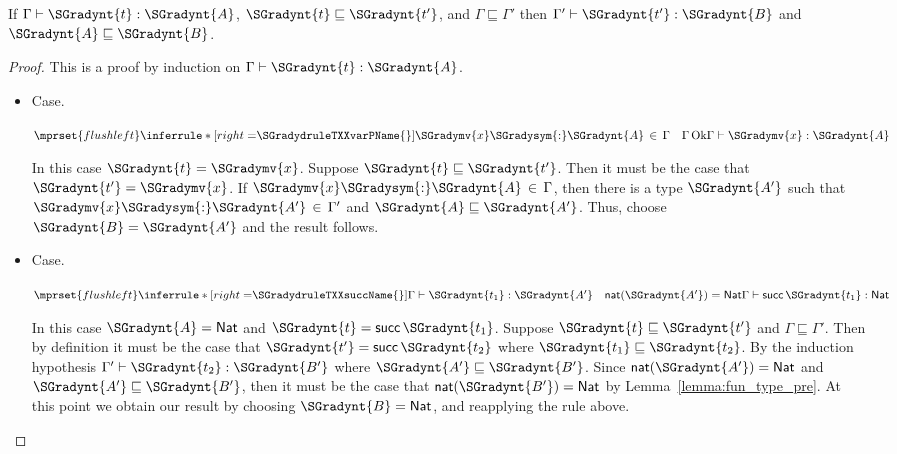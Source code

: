 \begin{lemma}
  \label{lemma:gradual_guarantee_part_one}
  If $ \Gamma  \vdash  \SGradynt{t}  :  \SGradynt{A} $, $ \SGradynt{t}  \sqsubseteq  \SGradynt{t'} $, and $ \Gamma  \sqsubseteq  \Gamma' $ then $ \Gamma'  \vdash  \SGradynt{t'}  :  \SGradynt{B} $ and $ \SGradynt{A}  \sqsubseteq  \SGradynt{B} $.
\end{lemma}
\begin{proof}
  This is a proof by induction on $ \Gamma  \vdash  \SGradynt{t}  :  \SGradynt{A} $.

  \begin{itemize}
  \item[] Case.\ \\ 
    \begin{center}
      \begin{math}
        $$\mprset{flushleft}
        \inferrule* [right=$\SGradydruleTXXvarPName{}$] {
           \SGradymv{x}  \SGradysym{:}  \SGradynt{A} \, \in \, \Gamma  \quad   \Gamma \,\text{Ok}  
        }{ \Gamma  \vdash  \SGradymv{x}  :  \SGradynt{A} }
      \end{math}
    \end{center}
    In this case $\SGradynt{t} = \SGradymv{x}$.  Suppose $ \SGradynt{t}  \sqsubseteq  \SGradynt{t'} $.  Then
    it must be the case that $\SGradynt{t'} = \SGradymv{x}$.  If $\SGradymv{x}  \SGradysym{:}  \SGradynt{A} \, \in \, \Gamma$,
    then there is a type $\SGradynt{A'}$ such that $\SGradymv{x}  \SGradysym{:}  \SGradynt{A'} \, \in \, \Gamma'$ and
    $ \SGradynt{A}  \sqsubseteq  \SGradynt{A'} $.  Thus, choose $\SGradynt{B} = \SGradynt{A'}$ and the result follows.

  \item[] Case.\ \\ 
    \begin{center}
      \begin{math}
        $$\mprset{flushleft}
        \inferrule* [right=$\SGradydruleTXXsuccName{}$] {
            \Gamma  \vdash  \SGradynt{t_{{\mathrm{1}}}}  :  \SGradynt{A'}   \quad   \mathsf{nat}( \SGradynt{A'} ) =   \mathsf{Nat}   
        }{ \Gamma  \vdash  \mathsf{succ} \, \SGradynt{t_{{\mathrm{1}}}}  :   \mathsf{Nat}  }
      \end{math}
    \end{center}
    In this case $\SGradynt{A} =  \mathsf{Nat} $ and $\SGradynt{t} = \mathsf{succ} \, \SGradynt{t_{{\mathrm{1}}}}$.  Suppose $ \SGradynt{t}  \sqsubseteq  \SGradynt{t'} $ and $ \Gamma  \sqsubseteq  \Gamma' $.
    Then by definition it must be the case that $\SGradynt{t'} = \mathsf{succ} \, \SGradynt{t_{{\mathrm{2}}}}$ where $ \SGradynt{t_{{\mathrm{1}}}}  \sqsubseteq  \SGradynt{t_{{\mathrm{2}}}} $.
    By the induction hypothesis $ \Gamma'  \vdash  \SGradynt{t_{{\mathrm{2}}}}  :  \SGradynt{B'} $ where $ \SGradynt{A'}  \sqsubseteq  \SGradynt{B'} $.  Since $ \mathsf{nat}( \SGradynt{A'} ) =   \mathsf{Nat}  $
    and $ \SGradynt{A'}  \sqsubseteq  \SGradynt{B'} $, then it must be the case that $ \mathsf{nat}( \SGradynt{B'} ) =   \mathsf{Nat}  $ by Lemma~\ref{lemma:fun_type_pre}.
    At this point we obtain our result by choosing $\SGradynt{B} =  \mathsf{Nat} $, and reapplying the rule above.


\end{itemize}
\end{proof}
